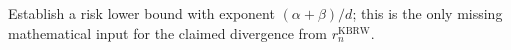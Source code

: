 Establish a risk lower bound with exponent \((\alpha+\beta)/d\); this is the only missing mathematical input for the claimed divergence from \(r_n^{\mathrm{KBRW}}\).